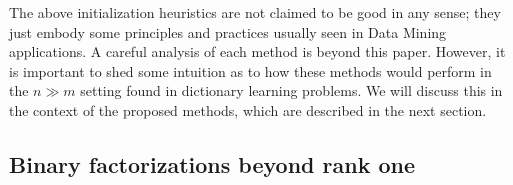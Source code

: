 \documentclass[a4paper]{IEEEtran}
\begin{document}
The above initialization heuristics are not claimed to be good in any sense; they just embody some principles and practices usually seen in Data Mining applications. A careful analysis of each method is beyond this paper. However, it is important to shed some intuition as to how these methods would perform in the $n \gg m$ setting found in dictionary learning problems. We will discuss this in the context of the proposed methods, which are described in the next section.

\subsection{Binary factorizations beyond rank one}
\end{document}
